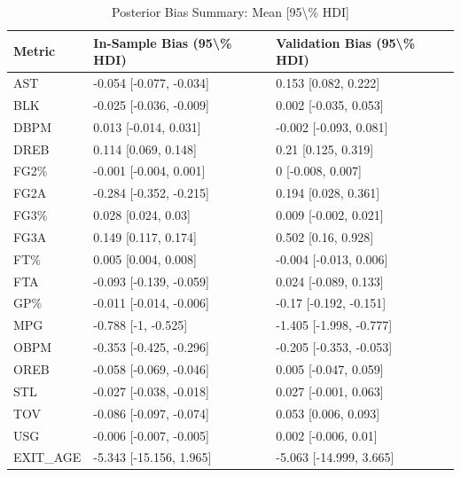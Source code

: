 \begin{table}[t]
\caption*{
{\fontsize{20}{25}\selectfont  Posterior Bias Summary: Mean [95\textbackslash{}\% HDI]\fontsize{12}{15}\selectfont }
} 
\fontsize{12.0pt}{14.0pt}\selectfont
\begin{tabular*}{\linewidth}{@{\extracolsep{\fill}}lll}
\toprule
Metric & In-Sample Bias (95\textbackslash{}\% HDI) & Validation Bias (95\textbackslash{}\% HDI) \\ 
\midrule\addlinespace[2.5pt]
AST & -0.054 [-0.077, -0.034] & 0.153 [0.082, 0.222] \\ 
BLK & -0.025 [-0.036, -0.009] & 0.002 [-0.035, 0.053] \\ 
DBPM & 0.013 [-0.014, 0.031] & -0.002 [-0.093, 0.081] \\ 
DREB & 0.114 [0.069, 0.148] & 0.21 [0.125, 0.319] \\ 
FG2\% & -0.001 [-0.004, 0.001] & 0 [-0.008, 0.007] \\ 
FG2A & -0.284 [-0.352, -0.215] & 0.194 [0.028, 0.361] \\ 
FG3\% & 0.028 [0.024, 0.03] & 0.009 [-0.002, 0.021] \\ 
FG3A & 0.149 [0.117, 0.174] & 0.502 [0.16, 0.928] \\ 
FT\% & 0.005 [0.004, 0.008] & -0.004 [-0.013, 0.006] \\ 
FTA & -0.093 [-0.139, -0.059] & 0.024 [-0.089, 0.133] \\ 
GP\% & -0.011 [-0.014, -0.006] & -0.17 [-0.192, -0.151] \\ 
MPG & -0.788 [-1, -0.525] & -1.405 [-1.998, -0.777] \\ 
OBPM & -0.353 [-0.425, -0.296] & -0.205 [-0.353, -0.053] \\ 
OREB & -0.058 [-0.069, -0.046] & 0.005 [-0.047, 0.059] \\ 
STL & -0.027 [-0.038, -0.018] & 0.027 [-0.001, 0.063] \\ 
TOV & -0.086 [-0.097, -0.074] & 0.053 [0.006, 0.093] \\ 
USG & -0.006 [-0.007, -0.005] & 0.002 [-0.006, 0.01] \\ 
EXIT\_AGE & -5.343 [-15.156, 1.965] & -5.063 [-14.999, 3.665] \\ 
\bottomrule
\end{tabular*}
\end{table}

